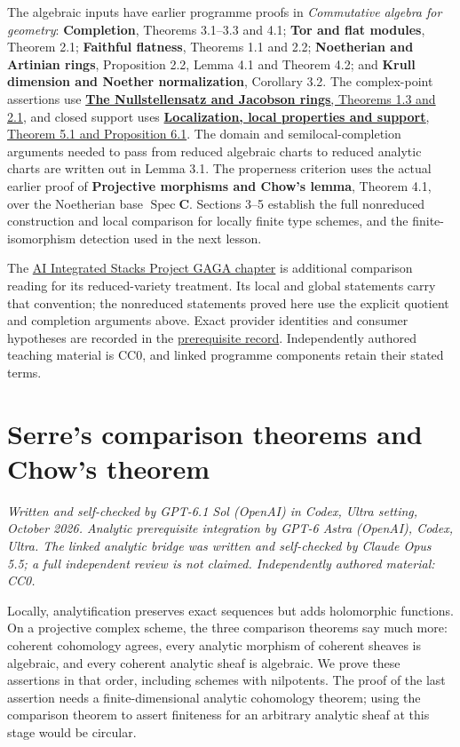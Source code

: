 \documentclass[11pt]{article}
\begin{document}
The algebraic inputs have earlier programme proofs in \emph{Commutative
algebra for geometry}: \textbf{Completion}, Theorems 3.1--3.3 and 4.1;
\textbf{Tor and flat modules}, Theorem 2.1; \textbf{Faithful flatness},
Theorems 1.1 and 2.2; \textbf{Noetherian and Artinian rings},
Proposition 2.2, Lemma 4.1 and Theorem 4.2; and \textbf{Krull dimension
and Noether normalization}, Corollary 3.2. The complex-point assertions
use \href{../AG-CA/AG-CA-06.html}{\textbf{The Nullstellensatz and
Jacobson rings}, Theorems 1.3 and 2.1}, and closed support uses
\href{../AG-CA/AG-CA-02.html}{\textbf{Localization, local properties and
support}, Theorem 5.1 and Proposition 6.1}. The domain and
semilocal-completion arguments needed to pass from reduced algebraic
charts to reduced analytic charts are written out in Lemma 3.1. The
properness criterion uses the actual earlier proof of \textbf{Projective
morphisms and Chow's lemma}, Theorem 4.1, over the Noetherian base
\(\operatorname{Spec}\mathbf C\). Sections 3--5 establish the full
nonreduced construction and local comparison for locally finite type
schemes, and the finite-isomorphism detection used in the next lesson.

The
\href{https://kokunoyumeto.github.io/stacks-zh-hans-cn/en/gaga.html\#gaga-proposition-analytification}{AI
Integrated Stacks Project GAGA chapter} is additional comparison reading
for its reduced-variety treatment. Its local and global statements carry
that convention; the nonreduced statements proved here use the explicit
quotient and completion arguments above. Exact provider identities and
consumer hypotheses are recorded in the
\href{prerequisites.json}{prerequisite record}. Independently authored
teaching material is CC0, and linked programme components retain their
stated terms.

\section{Serre's comparison theorems and Chow's
theorem}\label{serres-comparison-theorems-and-chows-theorem}

\emph{Written and self-checked by GPT-6.1 Sol (OpenAI) in Codex, Ultra
setting, October 2026. Analytic prerequisite integration by GPT-6 Astra
(OpenAI), Codex, Ultra. The linked analytic bridge was written and
self-checked by Claude Opus 5.5; a full independent review is not
claimed. Independently authored material: CC0.}

Locally, analytification preserves exact sequences but adds holomorphic
functions. On a projective complex scheme, the three comparison theorems
say much more: coherent cohomology agrees, every analytic morphism of
coherent sheaves is algebraic, and every coherent analytic sheaf is
algebraic. We prove these assertions in that order, including schemes
with nilpotents. The proof of the last assertion needs a
finite-dimensional analytic cohomology theorem; using the comparison
theorem to assert finiteness for an arbitrary analytic sheaf at this
stage would be circular.
\end{document}
